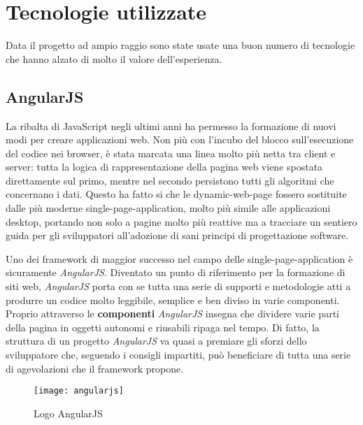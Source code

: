 \section{Tecnologie utilizzate}
\label{sec:tecnologie}
Data il progetto ad ampio raggio sono state usate una buon numero di tecnologie
che hanno alzato di molto il valore dell'esperienza.

\subsection{AngularJS}
La ribalta di JavaScript negli ultimi anni ha permesso la formazione di
nuovi modi per creare applicazioni web. Non più con l'incubo del blocco
sull'esecuzione del codice nei browser, è stata marcata una linea molto più
netta tra client e server: tutta la logica di rappresentazione della pagina web
viene spostata direttamente sul primo, mentre nel secondo persistono tutti
gli algoritmi che concernano i dati. Questo ha fatto si che le
\gls{dynamic-web-page} fossero sostituite dalle più moderne
\gls{single-page-application}, molto più simile alle applicazioni desktop,
portando non solo a pagine molto più reattive ma a tracciare un sentiero guida
per gli sviluppatori all'adozione di sani principi di progettazione software.

Uno dei framework di maggior successo nel campo delle
\gls{single-page-application} è sicuramente \textit{AngularJS}. Diventato un
punto di riferimento per la formazione di siti web, \textit{AngularJS} porta
con se tutta una serie di supporti e metodologie atti a produrre un codice molto
leggibile, semplice e ben diviso in varie componenti. Proprio attraverso le
\textbf{componenti} \textit{AngularJS} insegna che dividere varie parti della
pagina in oggetti autonomi e riusabili ripaga nel tempo. Di fatto, la struttura
di un progetto \textit{AngularJS} va quasi a premiare gli sforzi dello
sviluppatore che, seguendo i consigli impartiti, può beneficiare di tutta una
serie di agevolazioni che il framework propone.

\begin{figure}[H]
\begin{center}
\texttt{[image: angularjs]}
\caption{Logo AngularJS}
\label{fig:angularjs_logo}
\end{center}
\end{figure}

